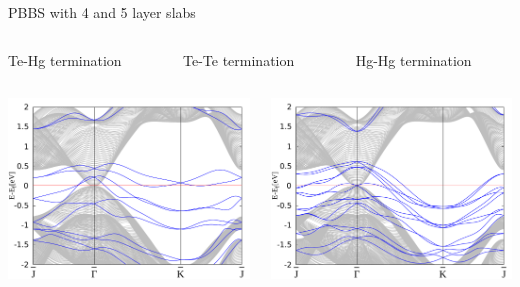 \begin{frame}{PBBS with 4 and 5 layer slabs}
	\begin{columns}
		\begin{column}{.34\linewidth}
			\centering
			Te-Hg termination
		\end{column}
		\begin{column}{.34\linewidth}
			\centering
			Te-Te termination
		\end{column}
		\begin{column}{.34\linewidth}
			\centering
			Hg-Hg termination
		\end{column}
	\end{columns}
	\begin{columns}
		\begin{column}{.34\linewidth}
			\centering
			\includegraphics[width=\linewidth]{Te_and_Hg_termination/no_H_bulk+4_layers_no_dos_-2_2.pdf}
		\end{column}
		\begin{column}{.34\linewidth}
			\centering
			\includegraphics[width=\linewidth]{Te_termination/no_H_bulk+5_layers_no_dos_-2_2.pdf}

\end{column}
\end{columns}
\end{frame}
